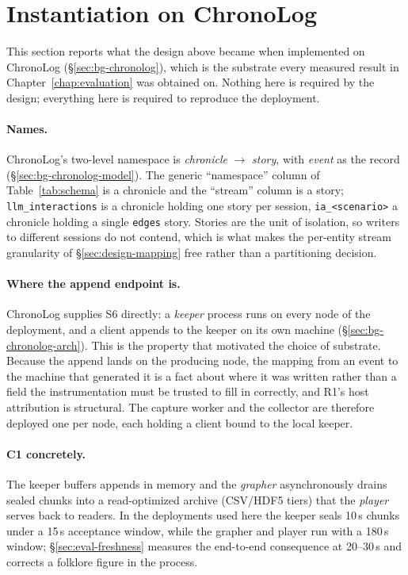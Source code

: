 \section{Instantiation on ChronoLog}
\label{sec:design-chronolog}

This section reports what the design above became when implemented on
ChronoLog (\S\ref{sec:bg-chronolog}), which is the substrate every measured
result in Chapter~\ref{chap:evaluation} was obtained on. Nothing here is
required by the design; everything here is required to reproduce the
deployment.

\paragraph{Names.} ChronoLog's two-level namespace is
\emph{chronicle} $\to$ \emph{story}, with \emph{event} as the record
(\S\ref{sec:bg-chronolog-model}). The generic ``namespace'' column of
Table~\ref{tab:schema} is a chronicle and the ``stream'' column is a story;
\texttt{llm\_interactions} is a chronicle holding one story per session,
\texttt{ia\_<scenario>} a chronicle holding a single \texttt{edges} story.
Stories are the unit of isolation, so writers to different sessions do not
contend, which is what makes the per-entity stream granularity of
\S\ref{sec:design-mapping} free rather than a partitioning decision.

\paragraph{Where the append endpoint is.} ChronoLog supplies S6 directly: a
\emph{keeper} process runs on every node of the deployment, and a client
appends to the keeper on its own machine
(\S\ref{sec:bg-chronolog-arch}). This is the property that motivated the
choice of substrate. Because the append lands on the producing node, the
mapping from an event to the machine that generated it is a fact about
where it was written rather than a field the instrumentation must be
trusted to fill in correctly, and R1's host attribution is structural. The
capture worker and the collector are therefore deployed one per node, each
holding a client bound to the local keeper.

\paragraph{C1 concretely.} The keeper buffers appends in memory and the
\emph{grapher} asynchronously drains sealed chunks into a read-optimized
archive (CSV/HDF5 tiers) that the \emph{player} serves back to readers. In
the deployments used here the keeper seals 10\,s chunks under a 15\,s
acceptance window, while the grapher and player run with a 180\,s window;
\S\ref{sec:eval-freshness} measures the end-to-end consequence at 20--30\,s
and corrects a folklore figure in the process.

